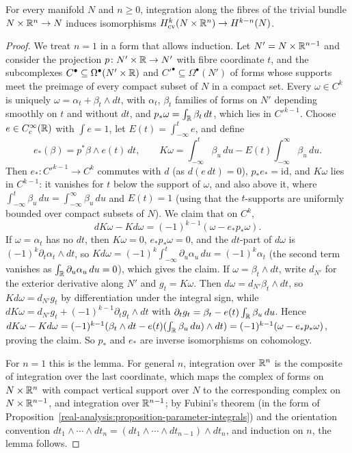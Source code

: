 \begin{lemma}\label{characteristic-classes:lemma-thom-trivial}
For every manifold $N$ and $n \geq 0$, integration along the fibres of the trivial bundle $N \times \mathbb{R}^n \to N$ induces isomorphisms $H^k_{\mathrm{cv}}(N \times \mathbb{R}^n) \to H^{k-n}(N)$.
\end{lemma}

\begin{proof}
We treat $n = 1$ in a form that allows induction. Let $N' = N \times \mathbb{R}^{n-1}$ and consider the projection $p \colon N' \times \mathbb{R} \to N'$ with fibre coordinate $t$, and the subcomplexes $C^\bullet \subseteq \Omega^\bullet(N' \times \mathbb{R})$ and
$C'^\bullet \subseteq \Omega^\bullet(N')$ of forms whose supports meet the preimage of every compact subset of $N$ in a compact set. Every $\omega \in C^k$ is uniquely $\omega = \alpha_t + \beta_t \wedge dt$, with $\alpha_t$, $\beta_t$ families of
forms on $N'$ depending smoothly on $t$ and without $dt$, and $p_*\omega = \int_{\mathbb{R}}\beta_t\,dt$, which lies in $C'^{k-1}$. Choose $e \in C^\infty_c(\mathbb{R})$ with $\int e = 1$, let $E(t) = \int_{-\infty}^te$, and define
\[
e_*(\beta) = p^*\beta \wedge e(t)\,dt, \qquad K\omega = \int_{-\infty}^t\beta_u\,du - E(t)\int_{-\infty}^\infty\beta_u\,du.
\]
Then $e_* \colon C'^{k-1} \to C^k$ commutes with $d$ (as $d(e\,dt) = 0$), $p_*e_* = \mathrm{id}$, and $K\omega$ lies in $C^{k-1}$: it vanishes for $t$ below the support of $\omega$, and also above it, where $\int_{-\infty}^t\beta_u\,du = \int_{-\infty}^\infty\beta_u\,du$
and $E(t) = 1$ (using that the $t$-supports are uniformly bounded over compact subsets of $N$). We claim that on $C^k$,
\[
dK\omega - Kd\omega = (-1)^{k-1}(\omega - e_*p_*\omega).
\]
If $\omega = \alpha_t$ has no $dt$, then $K\omega = 0$, $e_*p_*\omega = 0$, and the $dt$-part of $d\omega$ is $(-1)^k\partial_t\alpha_t \wedge dt$, so $Kd\omega = (-1)^k\int_{-\infty}^t\partial_u\alpha_u\,du = (-1)^k\alpha_t$ (the second term vanishes as
$\int_{\mathbb{R}}\partial_u\alpha_u\,du = 0$), which gives the claim. If $\omega = \beta_t \wedge dt$, write $d_{N'}$ for the exterior derivative along $N'$ and $g_t = K\omega$. Then $d\omega = d_{N'}\beta_t \wedge dt$, so
$Kd\omega = d_{N'}g_t$ by differentiation under the integral sign, while $dK\omega = d_{N'}g_t + (-1)^{k-1}\partial_tg_t \wedge dt$ with $\partial_tg_t = \beta_t - e(t)\int_{\mathbb{R}}\beta_u\,du$. Hence
$dK\omega - Kd\omega = (-1)^{k-1}(\beta_t \wedge dt - e(t)(\int_{\mathbb{R}}\beta_u\,du) \wedge dt) = (-1)^{k-1}(\omega - e_*p_*\omega)$, proving the claim. So $p_*$ and $e_*$ are inverse isomorphisms on cohomology.

For $n = 1$ this is the lemma. For general $n$, integration over $\mathbb{R}^n$ is the composite of integration over the last coordinate, which maps the complex of forms on $N \times \mathbb{R}^n$ with compact vertical support over $N$ to
the corresponding complex on $N \times \mathbb{R}^{n-1}$, and integration over $\mathbb{R}^{n-1}$; by Fubini's theorem (in the form of Proposition~\ref{real-analysis:proposition-parameter-integrals}) and the orientation convention
$dt_1 \wedge \cdots \wedge dt_n = (dt_1 \wedge \cdots \wedge dt_{n-1}) \wedge dt_n$, and induction on $n$, the lemma follows.
\end{proof}

